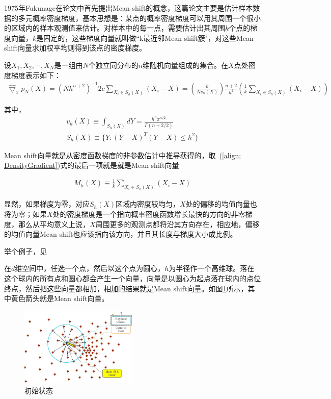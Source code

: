 \documentclass[12pt]{article}
\begin{document}
1975年Fukunage在论文\cite{fukunaga1975estimation}中首先提出Mean shift的概念，这篇论文主要是估计样本数据的多元概率密度梯度，基本思想是：某点的概率密度梯度可以用其周围一个很小的区域内的样本观测值来估计。对样本中的每一点，需要估计出其周围$k$个点的梯度向量，$k$是固定的，这些梯度向量就叫做“k最近邻Mean shift簇"，对这些Mean shift向量求加权平均则得到该点的密度梯度。

设$X_1, X_2, \cdots, X_N$是一组由$N$个独立同分布的$n$维随机向量组成的集合。在$X$点处密度梯度表示如下：
\begin{align}
\label{align: DensityGradient}
\hat{\bigtriangledown}_x p_N(X) = (Nh^{n+2})^{-1}2c \sum_{X_i \in S_h(X)} (X_i - X) = \left(\frac{k}{Nv_h(X)}\right) \frac{n+2}{h^2} \left(\frac{1}{k} \sum_{X_i \in S_h(X)} (X_i - X)\right)
\end{align}

其中，
\begin{align}
v_h(X) \equiv \int_{S_h(X)}dY = \frac{h^n\pi^{n/2}}{\Gamma(n+2/2)}\\
S_h(X) \equiv \{Y:(Y-X)^T(Y-X) \le h^2\}
\end{align}

Mean shift向量就是从密度函数梯度的非参数估计中推导获得的，取~(\ref{align: DensityGradient})式的最后一项就是就是Mean shift向量

\begin{align}
M_h(X) \equiv \frac{1}{k} \sum_{X_i \in S_h(X)} (X_i-X)
\end{align}

显然，如果梯度为零，对应$S_h(X)$区域内密度较均匀，$X$处的偏移的均值向量也将为零；如果$X$处的密度梯度是一个指向概率密度函数增长最快的方向的非零梯度，那么从平均意义上说，$X$周围更多的观测点都将沿其方向存在，相应地，偏移的均值向量Mean shift也应该指向该方向，并且其长度与梯度大小成比例。

举个例子，见\cite{MeanShiftExample}

在$d$维空间中，任选一个点，然后以这个点为圆心，$h$为半径作一个高维球。落在这个球内的所有点和圆心都会产生一个向量，向量是以圆心为起点落在球内的点位终点，然后把这些向量都相加，相加的结果就是Mean shift向量。如图\ref{fig: meanshift1}所示，其中黄色箭头就是Mean shift向量。

\begin{figure}[!ht]
\centering
\includegraphics[width=0.5\textwidth]{meanshift1.jpg}
\caption{初始状态}
\label{fig: meanshift1}
\end{figure} 
\end{document}
